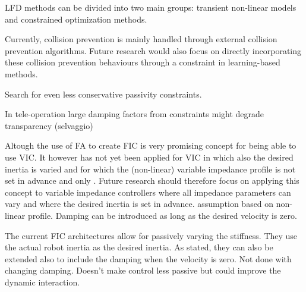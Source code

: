 LFD methods can be divided into two main groups: transient non-linear models and constrained optimization methods.


Currently, collision prevention is mainly handled through external collision prevention algorithms. Future research would also focus on directly incorporating these collision prevention behaviours through a constraint in learning-based methods.


Search for even less conservative passivity constraints.


In tele-operation large damping factors from constraints might degrade transparency (selvaggio)


Altough the use of FA to create FIC is very promising concept for being able to use VIC. It however has not yet been applied for VIC in which also the desired inertia is varied and for which the (non-linear) variable impedance profile is not set in advance and only . Future research should therefore focus on applying this concept to variable impedance controllers where all impedance parameters can vary and where the desired inertia is set in advance. assumption based on non-linear profile.
Damping can be introduced as long as the desired velocity is zero.

The current FIC architectures allow for passively varying the stiffness. They use the actual robot inertia as the desired inertia. As stated, they can also be extended also to include the damping when the velocity is zero.
Not done with changing damping. Doesn't make control less passive but could improve the dynamic interaction.

